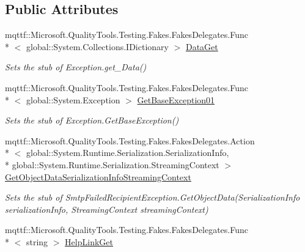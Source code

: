 \subsection*{Public Attributes}
\begin{DoxyCompactItemize}
\item 
mqttf\-::\-Microsoft.\-Quality\-Tools.\-Testing.\-Fakes.\-Fakes\-Delegates.\-Func\\*
$<$ global\-::\-System.\-Collections.\-I\-Dictionary $>$ \hyperlink{class_system_1_1_net_1_1_mail_1_1_fakes_1_1_stub_smtp_failed_recipient_exception_a7c9228e107621ec48f20fcfb3488bf68}{Data\-Get}
\begin{DoxyCompactList}\small\item\em Sets the stub of Exception.\-get\-\_\-\-Data()\end{DoxyCompactList}\item 
mqttf\-::\-Microsoft.\-Quality\-Tools.\-Testing.\-Fakes.\-Fakes\-Delegates.\-Func\\*
$<$ global\-::\-System.\-Exception $>$ \hyperlink{class_system_1_1_net_1_1_mail_1_1_fakes_1_1_stub_smtp_failed_recipient_exception_a31153e7cf5936c057b0d7483b74fcbb1}{Get\-Base\-Exception01}
\begin{DoxyCompactList}\small\item\em Sets the stub of Exception.\-Get\-Base\-Exception()\end{DoxyCompactList}\item 
mqttf\-::\-Microsoft.\-Quality\-Tools.\-Testing.\-Fakes.\-Fakes\-Delegates.\-Action\\*
$<$ global\-::\-System.\-Runtime.\-Serialization.\-Serialization\-Info, \\*
global\-::\-System.\-Runtime.\-Serialization.\-Streaming\-Context $>$ \hyperlink{class_system_1_1_net_1_1_mail_1_1_fakes_1_1_stub_smtp_failed_recipient_exception_a22b7c171b7902b6c99efcc64d764c6ec}{Get\-Object\-Data\-Serialization\-Info\-Streaming\-Context}
\begin{DoxyCompactList}\small\item\em Sets the stub of Smtp\-Failed\-Recipient\-Exception.\-Get\-Object\-Data(\-Serialization\-Info serialization\-Info, Streaming\-Context streaming\-Context)\end{DoxyCompactList}\item 
mqttf\-::\-Microsoft.\-Quality\-Tools.\-Testing.\-Fakes.\-Fakes\-Delegates.\-Func\\*
$<$ string $>$ \hyperlink{class_system_1_1_net_1_1_mail_1_1_fakes_1_1_stub_smtp_failed_recipient_exception_aa97486b17f9a8734bf59334000ddd693}{Help\-Link\-Get}

\end{DoxyCompactItemize}
